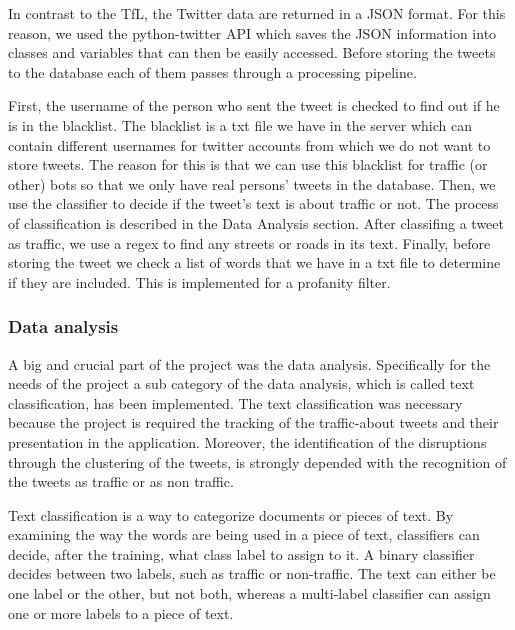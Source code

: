 In contrast to the TfL, the Twitter data are returned in a JSON format. For this reason, we used the python-twitter API which saves the JSON information into classes and variables that can then be easily accessed. Before storing the tweets to the database each of them passes through a processing pipeline.

First, the username of the person who sent the tweet is checked to find out if he is in the blacklist. The blacklist is a txt file we have in the server which can contain different usernames for twitter accounts from which we do not want to store tweets. The reason for this is that we can use this blacklist for traffic (or other) bots so that we only have real persons' tweets in the database. Then, we use the classifier to decide if the tweet's text is about traffic or not. The process of classification is described in the Data Analysis section. After classifing a tweet as traffic, we use a regex to find any streets or roads in its text. Finally, before storing the tweet we check a list of words that we have in a txt file to determine if they are included. This is implemented for a profanity filter.

\subsubsection{Data analysis}
A big and crucial part of the project was the data analysis. Specifically for the needs of the project a sub category of the data analysis, which is called text classification, has been implemented. The text classification was necessary because the project is required the tracking of the traffic-about tweets and their presentation in the application. Moreover, the identification of the disruptions through the clustering of the tweets, is strongly depended with the recognition of the tweets as traffic or as non traffic. 

Text classification is a way to categorize documents or pieces of text. By examining the way the words are being used in a piece of text, classifiers can decide, after the training, what class label to assign to it. A binary classifier decides between two labels, such as traffic or non-traffic. The text can either be one label or the other, but not both, whereas a multi-label classifier can assign one or more labels to a piece of text. 

